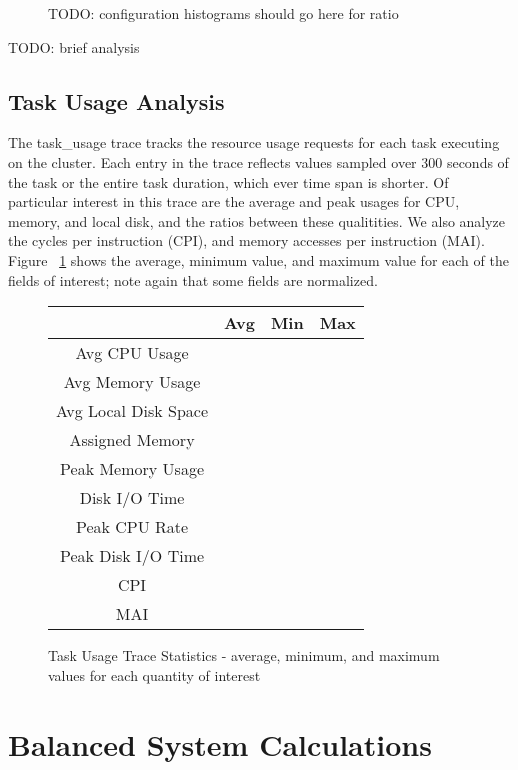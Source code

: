 \documentclass{sig-alternate}
\begin{document}
\begin{figure}
TODO: configuration histograms should go here for ratio
\end{figure}

TODO: brief analysis

\subsection{Task Usage Analysis}

The task\_usage trace tracks the resource usage requests for each task executing on the cluster.
Each entry in the trace reflects values sampled over 300 seconds of the task or the entire task duration, which ever time span is shorter.
Of particular interest in this trace are the average and peak usages for CPU, memory, and local disk, and the ratios between these qualitities.
We also analyze the cycles per instruction (CPI), and memory accesses per instruction (MAI).
Figure ~\ref{task_usage_stats} shows the average, minimum value, and maximum value for each of the fields of interest; note again that some fields are normalized.

\begin{figure}
\centering
\begin{tabular}{| c | c | c | c |} \hline
 & Avg & Min & Max \\ \hline
Avg CPU Usage & & & \\ \hline
Avg Memory Usage & & & \\ \hline
Avg Local Disk Space & & & \\ \hline
Assigned Memory & & & \\ \hline
Peak Memory Usage & & & \\ \hline
Disk I/O Time & & & \\ \hline
Peak CPU Rate & & & \\ \hline
Peak Disk I/O Time & & & \\ \hline
CPI & & & \\ \hline
MAI & & & \\ \hline
\end{tabular}
\caption{Task Usage Trace Statistics - average, minimum, and maximum values for each quantity of interest}
\label{task_usage_stats}
\end{figure}

\section{Balanced System Calculations}
\end{document}
